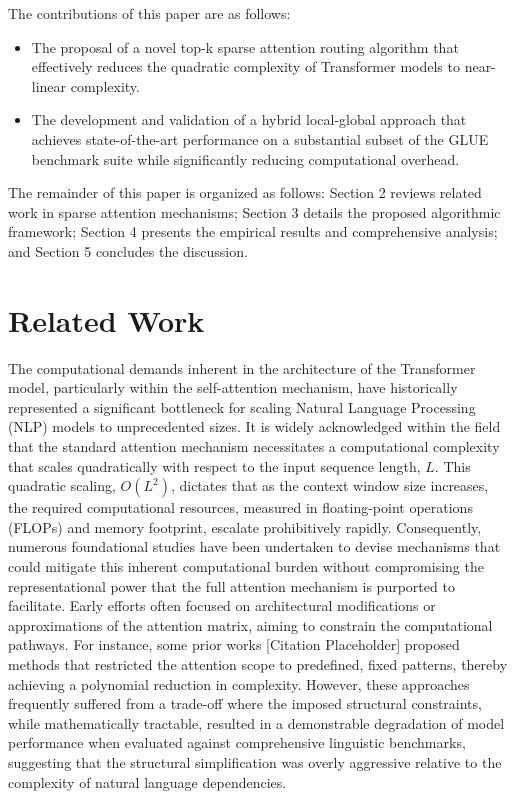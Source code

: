 \documentclass[12pt]{article}
\begin{document}
The contributions of this paper are as follows:
\begin{itemize}
    \item The proposal of a novel top-k sparse attention routing algorithm that effectively reduces the quadratic complexity of Transformer models to near-linear complexity.
    \item The development and validation of a hybrid local-global approach that achieves state-of-the-art performance on a substantial subset of the GLUE benchmark suite while significantly reducing computational overhead.
\end{itemize}
The remainder of this paper is organized as follows: Section 2 reviews related work in sparse attention mechanisms; Section 3 details the proposed algorithmic framework; Section 4 presents the empirical results and comprehensive analysis; and Section 5 concludes the discussion.

\section{Related Work}
The computational demands inherent in the architecture of the Transformer model, particularly within the self-attention mechanism, have historically represented a significant bottleneck for scaling Natural Language Processing (NLP) models to unprecedented sizes. It is widely acknowledged within the field that the standard attention mechanism necessitates a computational complexity that scales quadratically with respect to the input sequence length, $L$. This quadratic scaling, $O(L^2)$, dictates that as the context window size increases, the required computational resources, measured in floating-point operations (FLOPs) and memory footprint, escalate prohibitively rapidly. Consequently, numerous foundational studies have been undertaken to devise mechanisms that could mitigate this inherent computational burden without compromising the representational power that the full attention mechanism is purported to facilitate. Early efforts often focused on architectural modifications or approximations of the attention matrix, aiming to constrain the computational pathways. For instance, some prior works [Citation Placeholder] proposed methods that restricted the attention scope to predefined, fixed patterns, thereby achieving a polynomial reduction in complexity. However, these approaches frequently suffered from a trade-off where the imposed structural constraints, while mathematically tractable, resulted in a demonstrable degradation of model performance when evaluated against comprehensive linguistic benchmarks, suggesting that the structural simplification was overly aggressive relative to the complexity of natural language dependencies.
\end{document}
